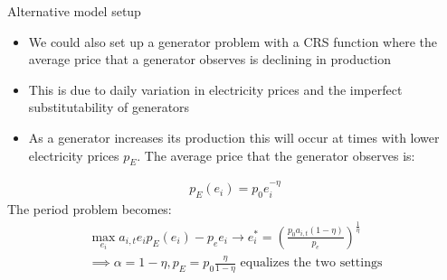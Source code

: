 \documentclass{beamer}
\begin{document}
\begin{frame}{Alternative model setup}\label{alt_model}
\footnotesize
\begin{itemize}
    \item We could also set up a generator problem with a CRS function where the average price that a generator observes is declining in production
    \item This is due to daily variation in electricity prices and the imperfect substitutability of generators
    \item As a generator increases its production this will occur at times with lower electricity prices $p_E$. The average price that the generator observes is:
\end{itemize}   
    \small\begin{align*}
        p_E(e_i) = p_0e_i^{-\eta}
    \end{align*}
    \small The period problem becomes:
    \small\begin{align*}
        \max_{e_i} a_{i,t}e_ip_E(e_i) - p_ee_i \rightarrow e_i^* = (\frac{p_0a_{i,t}(1-\eta)}{p_e})^\frac{1}{\eta} \\\implies \alpha = 1-\eta , p_E = p_0\frac{\eta}{1-\eta} \text{ equalizes the two settings}
    \end{align*}
    \hyperlink{gen_problem}{}   
\end{frame}
\end{document}

